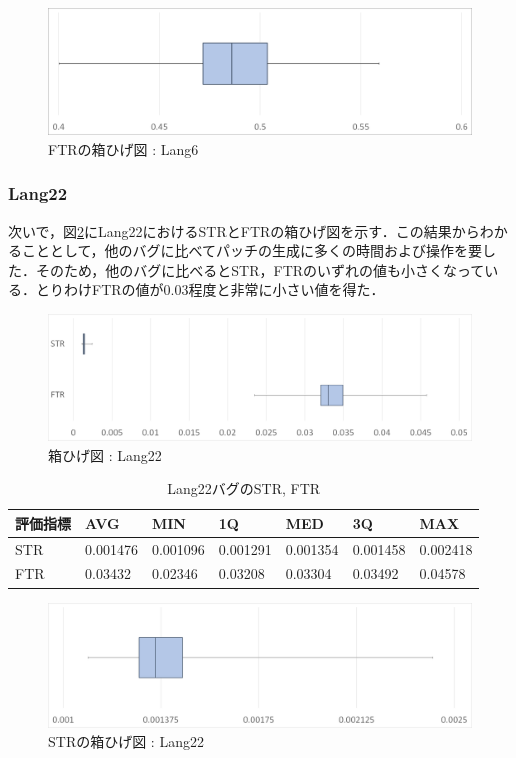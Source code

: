 \documentclass[uplatex,dvipdfmx,a4paper]{jsarticle}
\begin{document}
\begin{figure}[t]
  \centering
  \includegraphics[width=\linewidth]{fig/Lang6_boxplot_FTR.png}
  \caption{FTRの箱ひげ図 : Lang6}
  \label{fig:Lang6_boxplot_FTR}
\end{figure}
\subsubsection{Lang22}
次いで，図\ref{fig:Lang22_boxplot}にLang22におけるSTRとFTRの箱ひげ図を示す．この結果からわかることとして，他のバグに比べてパッチの生成に多くの時間および操作を要した．そのため，他のバグに比べるとSTR，FTRのいずれの値も小さくなっている．とりわけFTRの値が0.03程度と非常に小さい値を得た．
\begin{figure}[t]
  \centering
  \includegraphics[width=\linewidth]{fig/Lang22_boxplot.png}
  \caption{箱ひげ図 : Lang22}
  \label{fig:Lang22_boxplot}
\end{figure}
\begin{table}[b]
  \centering
  \caption{Lang22バグのSTR, FTR}
  \label{tab:Lang22}
  \begin{tabular}{l|llllll} \hline\hline
    評価指標 & AVG         & MIN & 1Q & MED & 3Q & MAX   \\\hline
    STR & 0.001476 & 0.001096 & 0.001291 & 0.001354 & 0.001458 & 0.002418  \\
    FTR & 0.03432 & 0.02346 & 0.03208 & 0.03304 & 0.03492 & 0.04578 \\\hline\hline
  \end{tabular}
\end{table}
\begin{figure}[t]
  \centering
  \includegraphics[width=\linewidth]{fig/Lang22_boxplot_STR.png}
  \caption{STRの箱ひげ図 : Lang22}
  \label{fig:Lang22_boxplot_STR}
\end{figure}
\end{document}
